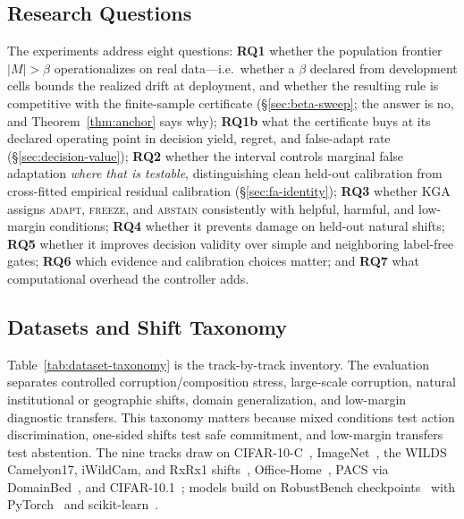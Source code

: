 \subsection{Research Questions}
The experiments address eight questions: \textbf{RQ1} whether the population frontier
$|M|>\beta$ operationalizes on real data---i.e.\ whether a $\beta$ declared from development cells
bounds the realized drift at deployment, and whether the resulting rule is competitive with the
finite-sample certificate (\S\ref{sec:beta-sweep}; the answer is no, and
Theorem~\ref{thm:anchor} says why); \textbf{RQ1b} what the certificate buys at its
declared operating point in decision yield, regret, and false-adapt rate
(\S\ref{sec:decision-value}); \textbf{RQ2} whether the interval controls marginal false adaptation
\emph{where that is testable}, distinguishing clean held-out calibration from cross-fitted empirical
residual calibration (\S\ref{sec:fa-identity}); \textbf{RQ3} whether KGA assigns \textsc{adapt},
\textsc{freeze}, and \textsc{abstain} consistently with helpful, harmful, and low-margin conditions;
\textbf{RQ4} whether it prevents damage on held-out natural shifts; \textbf{RQ5} whether it improves
decision validity over simple and neighboring label-free gates; \textbf{RQ6} which evidence and
calibration choices matter; and \textbf{RQ7} what computational overhead the controller adds.

\subsection{Datasets and Shift Taxonomy}
Table~\ref{tab:dataset-taxonomy} is the track-by-track inventory.
The evaluation separates controlled corruption/composition stress, large-scale corruption, natural institutional or geographic shifts, domain generalization, and low-margin diagnostic transfers. This taxonomy matters because mixed conditions test action discrimination, one-sided shifts test safe commitment, and low-margin transfers test abstention. The nine tracks draw on CIFAR-10-C~\cite{hendrycks2019cifar10c}, ImageNet~\cite{deng2009imagenet}, the WILDS Camelyon17, iWildCam, and RxRx1 shifts~\cite{koh2021wilds,bandi2019camelyon,taylor2019rxrx1}, Office-Home~\cite{venkateswara2017officehome}, PACS via DomainBed~\cite{gulrajani2021domainbed}, and CIFAR-10.1~\cite{recht2019cifar10}; models build on RobustBench checkpoints~\cite{croce2021robustbench} with PyTorch~\cite{paszke2019pytorch} and scikit-learn~\cite{pedregosa2011sklearn}.

